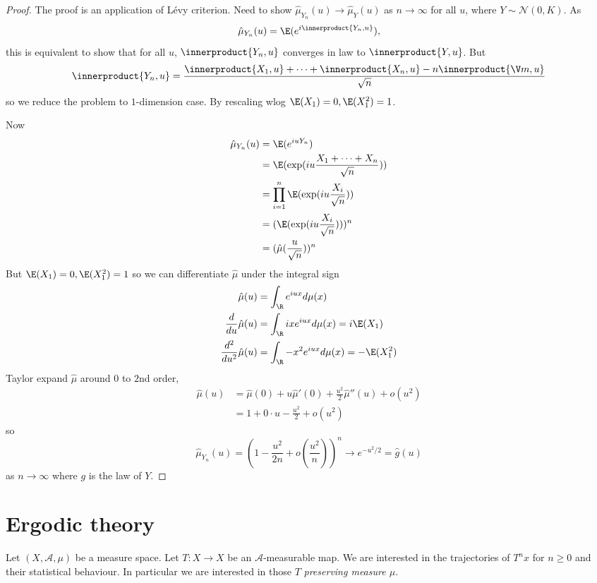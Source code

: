 \documentclass[a4paper]{article}
\newcommand*{\ip}{\innerproduct} %
\begin{document}

\begin{proof}
  The proof is an application of Lévy criterion. Need to show \(\hat \mu_{Y_n}(u) \to \hat \mu_Y(u)\) as \(n \to \infty\) for all \(u\), where \(Y \sim \mathcal N(0, K)\). As
  \[
    \hat \mu_{Y_n}(u) = \E( e^{i \ip{Y_n, u}}),
  \]
  this is equivalent to show that for all \(u\), \(\ip{Y_n, u}\) converges in law to \(\ip{Y, u}\). But
  \[
    \ip{Y_n, u} = \frac{\ip{X_1, u} + \dots + \ip{X_n, u} - n \ip{\V m, u}}{\sqrt n}
  \]
  so we reduce the problem to \(1\)-dimension case. By rescaling wlog \(\E(X_1) = 0, \E(X_1^2) = 1\).

  Now
  \begin{align*}
    \hat \mu_{Y_n}(u)
    &= \E(e^{iuY_n}) \\
    &= \E(\exp (iu \frac{X_1 + \dots + X_n}{\sqrt n})) \\
    &= \prod_{i = 1}^n \E(\exp (iu \frac{X_i}{\sqrt n})) \\
    &= (\E(\exp (iu \frac{X_i}{\sqrt n})))^n \\
    &= (\hat \mu (\frac{u}{\sqrt n}))^n
  \end{align*}
  But \(\E(X_1) = 0, \E(X_1^2) = 1\) so we can differentiate \(\hat \mu\) under the integral sign
  \begin{align*}
    \hat \mu(u) &= \int_\R e^{iux} d \mu(x) \\
    \frac{d}{du} \hat \mu(u) &= \int_\R ix e^{iux} d\mu(x) = i \E(X_1) \\
    \frac{d^2}{du^2} \hat \mu(u) &= \int_\R -x^2 e^{iux} d\mu(x) = -\E(X_1^2)
  \end{align*}
  Taylor expand \(\hat \mu\) around \(0\) to \(2\)nd order,
  \begin{align*}
    \hat \mu (u)
    &= \hat \mu(0) + u \hat \mu'(0) + \frac{u^2}{2} \hat \mu''(u) + o(u^2) \\
    &= 1 + 0 \cdot u - \frac{u^2}{2} + o(u^2)
  \end{align*}
  so
  \[
    \hat \mu_{Y_n}(u)
    = (1 - \frac{u^2}{2n} + o(\frac{u^2}{n}))^n
    \to e^{-u^2/2}
    = \hat g(u)
  \]
  as \(n \to \infty\) where \(g\) is the law of \(Y\).
\end{proof}

\section{Ergodic theory}

Let \((X, \mathcal A, \mu)\) be a measure space. Let \(T: X \to X\) be an \(\mathcal A\)-measurable map. We are interested in the trajectories of \(T^n x\) for \(n \geq 0\) and their statistical behaviour. In particular we are interested in those \(T\) \emph{preserving measure \(\mu\)}.
\end{document}
